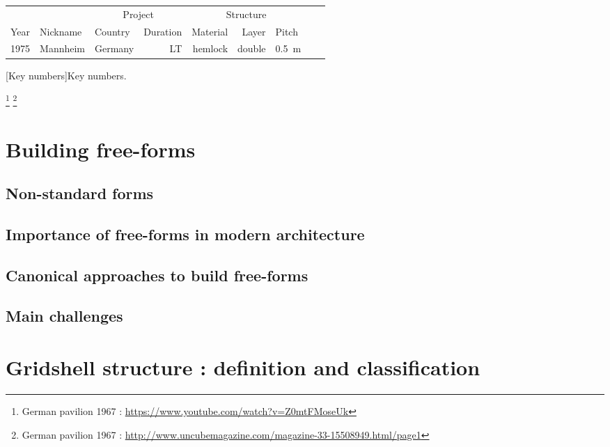 \clearpage

\begin{landscape}%
\begin{table}[p]
\centering
{}
 	\begin{tabularx}{20cm}{@{}lll rrrXXX@{}}
	\toprule
		&			& \multicolumn{2}{c}{Project} 			& \multicolumn{3}{c}{Structure}	 	\\
	\cmidrule(l){3-4} \cmidrule(l){5-7}
 	Year & Nickname 	& Country		& Duration			& Material 	& Layer	& Pitch		\\ 
	\midrule
	1975	& Mannheim	& Germany	& LT					& hemlock	 	& double	& \SI{0.5}{m}	\\	
	\bottomrule
 	\end{tabularx}
[Key numbers]{Key numbers.}
\end{table}
\end{landscape}%




\clearpage

\footnote{German pavilion 1967 : \url{https://www.youtube.com/watch?v=Z0mtFMoseUk}}
\footnote{German pavilion 1967 : \url{http://www.uncubemagazine.com/magazine-33-15508949.html/page1}}



\section{Building free-forms}
\subsection{Non-standard forms}
\subsection{Importance of free-forms in modern architecture}
\subsection{Canonical approaches to build free-forms}
\subsection{Main challenges}

\section{Gridshell structure : definition and classification}
